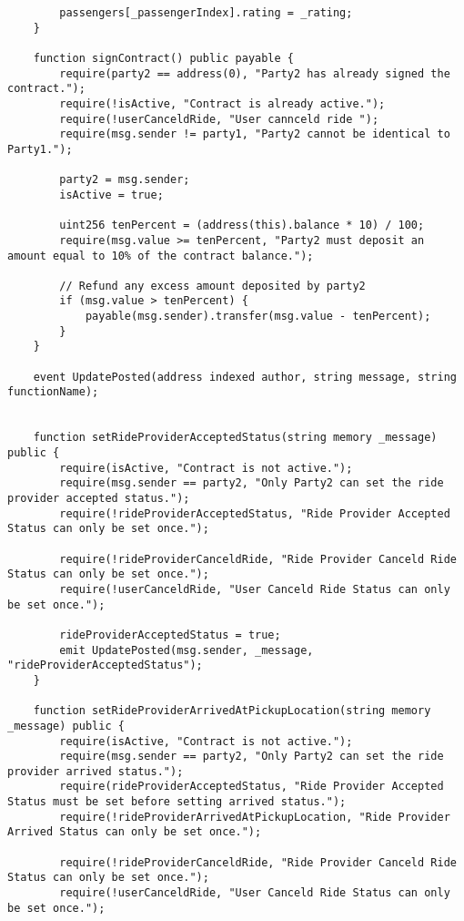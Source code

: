 \begin{lstlisting}
        passengers[_passengerIndex].rating = _rating;
    }

    function signContract() public payable {
        require(party2 == address(0), "Party2 has already signed the contract.");
        require(!isActive, "Contract is already active.");
        require(!userCanceldRide, "User cannceld ride ");
        require(msg.sender != party1, "Party2 cannot be identical to Party1.");
        
        party2 = msg.sender;
        isActive = true;

        uint256 tenPercent = (address(this).balance * 10) / 100;
        require(msg.value >= tenPercent, "Party2 must deposit an amount equal to 10% of the contract balance.");

        // Refund any excess amount deposited by party2
        if (msg.value > tenPercent) {
            payable(msg.sender).transfer(msg.value - tenPercent);
        }
    }

    event UpdatePosted(address indexed author, string message, string functionName);


    function setRideProviderAcceptedStatus(string memory _message) public {
        require(isActive, "Contract is not active.");
        require(msg.sender == party2, "Only Party2 can set the ride provider accepted status.");
        require(!rideProviderAcceptedStatus, "Ride Provider Accepted Status can only be set once.");

        require(!rideProviderCanceldRide, "Ride Provider Canceld Ride Status can only be set once.");
        require(!userCanceldRide, "User Canceld Ride Status can only be set once.");

        rideProviderAcceptedStatus = true;
        emit UpdatePosted(msg.sender, _message, "rideProviderAcceptedStatus");
    }

    function setRideProviderArrivedAtPickupLocation(string memory _message) public {
        require(isActive, "Contract is not active.");
        require(msg.sender == party2, "Only Party2 can set the ride provider arrived status.");
        require(rideProviderAcceptedStatus, "Ride Provider Accepted Status must be set before setting arrived status.");
        require(!rideProviderArrivedAtPickupLocation, "Ride Provider Arrived Status can only be set once.");

        require(!rideProviderCanceldRide, "Ride Provider Canceld Ride Status can only be set once.");
        require(!userCanceldRide, "User Canceld Ride Status can only be set once.");
        

\end{lstlisting}
